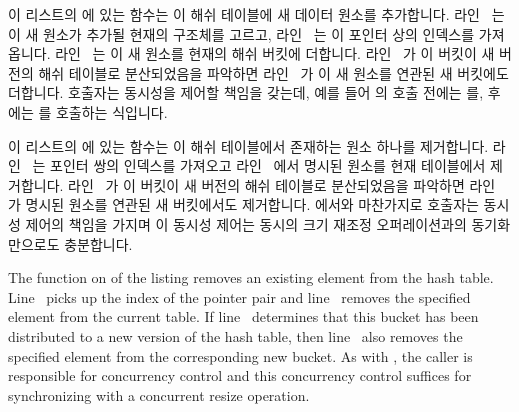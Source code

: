 \begin{fcvref}
이 리스트의  에 있는  함수는 이 해쉬
테이블에 새 데이터 원소를 추가합니다.
라인~ 는 이 새 원소가 추가될 현재의  구조체를 고르고,
라인~ 는 이 포인터 상의 인덱스를 가져옵니다.
라인~ 는 이 새 원소를 현재의 해쉬 버킷에 더합니다.
라인~ 가 이 버킷이 새 버전의 해쉬 테이블로 분산되었음을 파악하면
라인~ 가 이 새 원소를 연관된 새 버킷에도 더합니다.
호출자는 동시성을 제어할 책임을 갖는데, 예를 들어 의 호출
전에는  를, 후에는  를 호출하는
식입니다.
\end{fcvref}

\begin{fcvref}
이 리스트의  에 있는  함수는 이 해쉬
테이블에서 존재하는 원소 하나를 제거합니다.
라인~ 는 포인터 쌍의 인덱스를 가져오고 라인~ 에서 명시된
원소를 현재 테이블에서 제거합니다.
라인~ 가 이 버킷이 새 버전의 해쉬 테이블로 분산되었음을 파악하면
라인~ 가 명시된 원소를 연관된 새 버킷에서도 제거합니다.
 에서와 마찬가지로 호출자는 동시성 제어의 책임을 가지며 이
동시성 제어는 동시의 크기 재조정 오퍼레이션과의 동기화 만으로도 충분합니다.
\end{fcvref}

\iffalse

\begin{fcvref}
The  function on
 of the listing removes
an existing element from the hash table.
Line~ picks up the index of the pointer pair
and line~ removes the specified element from the current table.
If line~ determines that this bucket has been distributed
to a new version of the hash table, then line~ also removes
the specified element from the corresponding new bucket.
As with , the caller is responsible for concurrency
control and this concurrency control suffices for synchronizing with
a concurrent resize operation.
\end{fcvref}

